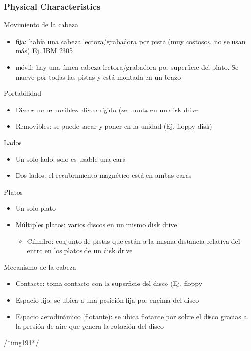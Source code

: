 \subsubsection{Physical Characteristics}
Movimiento de la cabeza
\begin{itemize}
\item fija: había una cabeza lectora/grabadora por pista (muy costosos, no se usan más) Ej. IBM 2305
\item móvil: hay una única cabeza lectora/grabadora por superficie del plato. Se mueve por todas las pistas y está montada en un brazo
\end{itemize}
Portabilidad
\begin{itemize}
\item Discos no removibles: disco rígido (se monta en un disk drive
\item Removibles: se puede sacar y poner en la unidad (Ej. floppy disk)
\end{itemize}
Lados
\begin{itemize}
\item Un solo lado: solo es usable una cara
\item Dos lados: el recubrimiento magnético está en ambas caras
\end{itemize}
Platos
\begin{itemize}
\item Un solo plato
\item Múltiples platos: varios discos en un mismo disk drive
	\begin{itemize}
	\item Cilindro: conjunto de pistas que están a la misma distancia relativa del entro en los platos de un disk drive
	\end{itemize}
\end{itemize}
Mecanismo de la cabeza
\begin{itemize}
\item Contacto: toma contacto con la superficie del disco (Ej. floppy
\item Espacio fijo: se ubica a una posición fija por encima del disco
\item Espacio aerodinámico (flotante): se ubica flotante por sobre el disco gracias a la presión de aire que genera la rotación del disco
\end{itemize}

/*img191*/

